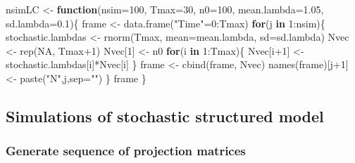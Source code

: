 \documentclass[
]{book}
\newenvironment{Shaded}{\begin{snugshade}}{\end{snugshade}}
\newcommand{\AttributeTok}[1]{\textcolor[rgb]{0.77,0.63,0.00}{#1}}
\newcommand{\ConstantTok}[1]{\textcolor[rgb]{0.00,0.00,0.00}{#1}}
\newcommand{\ControlFlowTok}[1]{\textcolor[rgb]{0.13,0.29,0.53}{\textbf{#1}}}
\newcommand{\DecValTok}[1]{\textcolor[rgb]{0.00,0.00,0.81}{#1}}
\newcommand{\FloatTok}[1]{\textcolor[rgb]{0.00,0.00,0.81}{#1}}
\newcommand{\FunctionTok}[1]{\textcolor[rgb]{0.00,0.00,0.00}{#1}}
\newcommand{\NormalTok}[1]{#1}
\newcommand{\OtherTok}[1]{\textcolor[rgb]{0.56,0.35,0.01}{#1}}
\newcommand{\SpecialCharTok}[1]{\textcolor[rgb]{0.00,0.00,0.00}{#1}}
\newcommand{\StringTok}[1]{\textcolor[rgb]{0.31,0.60,0.02}{#1}}
\begin{document}
\begin{Shaded}
\begin{Highlighting}[]
\NormalTok{nsimLC }\OtherTok{\textless{}{-}} \ControlFlowTok{function}\NormalTok{(}\AttributeTok{nsim=}\DecValTok{100}\NormalTok{, }
                   \AttributeTok{Tmax=}\DecValTok{30}\NormalTok{, }
                   \AttributeTok{n0=}\DecValTok{100}\NormalTok{, }
                   \AttributeTok{mean.lambda=}\FloatTok{1.05}\NormalTok{, }
                   \AttributeTok{sd.lambda=}\FloatTok{0.1}\NormalTok{)\{}
\NormalTok{  frame }\OtherTok{\textless{}{-}}  \FunctionTok{data.frame}\NormalTok{(}\StringTok{"Time"}\OtherTok{=}\DecValTok{0}\SpecialCharTok{:}\NormalTok{Tmax)}
  \ControlFlowTok{for}\NormalTok{(j }\ControlFlowTok{in} \DecValTok{1}\SpecialCharTok{:}\NormalTok{nsim)\{}
\NormalTok{  stochastic.lambdas }\OtherTok{\textless{}{-}} \FunctionTok{rnorm}\NormalTok{(Tmax, }
                              \AttributeTok{mean=}\NormalTok{mean.lambda, }
                              \AttributeTok{sd=}\NormalTok{sd.lambda)}
\NormalTok{  Nvec }\OtherTok{\textless{}{-}} \FunctionTok{rep}\NormalTok{(}\ConstantTok{NA}\NormalTok{, Tmax}\SpecialCharTok{+}\DecValTok{1}\NormalTok{)}
\NormalTok{  Nvec[}\DecValTok{1}\NormalTok{] }\OtherTok{\textless{}{-}}\NormalTok{ n0}
  \ControlFlowTok{for}\NormalTok{(i }\ControlFlowTok{in} \DecValTok{1}\SpecialCharTok{:}\NormalTok{Tmax)\{}
\NormalTok{    Nvec[i}\SpecialCharTok{+}\DecValTok{1}\NormalTok{] }\OtherTok{\textless{}{-}}\NormalTok{ stochastic.lambdas[i]}\SpecialCharTok{*}\NormalTok{Nvec[i]}
\NormalTok{  \}}
\NormalTok{  frame }\OtherTok{\textless{}{-}} \FunctionTok{cbind}\NormalTok{(frame, Nvec)}
  \FunctionTok{names}\NormalTok{(frame)[j}\SpecialCharTok{+}\DecValTok{1}\NormalTok{] }\OtherTok{\textless{}{-}} \FunctionTok{paste}\NormalTok{(}\StringTok{"N"}\NormalTok{,j,}\AttributeTok{sep=}\StringTok{""}\NormalTok{)}
\NormalTok{  \}}
\NormalTok{  frame}
\NormalTok{\}}
\end{Highlighting}
\end{Shaded}

\hypertarget{simulations-of-stochastic-structured-model}{%
\subsection{Simulations of stochastic structured model}\label{simulations-of-stochastic-structured-model}}

\hypertarget{generate-sequence-of-projection-matrices}{%
\subsubsection{Generate sequence of projection matrices}\label{generate-sequence-of-projection-matrices}}
\end{document}
